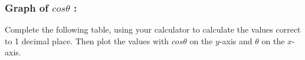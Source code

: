             \subsubsection{  Graph of $cos\theta $ :}
            \nopagebreak
\label{m39414*uid8032} Complete the following table, using your calculator to calculate the values correct to 1 decimal place. Then plot the values with $cos\theta $ on the $y$-axis and $\theta $ on the $x$-axis.\par 
    \setlength\mytablespace{16\tabcolsep}
    \addtolength\mytablespace{9\arrayrulewidth}
    \setlength\mytablewidth{\linewidth}
    \setlength\mytableroom{\mytablewidth}
